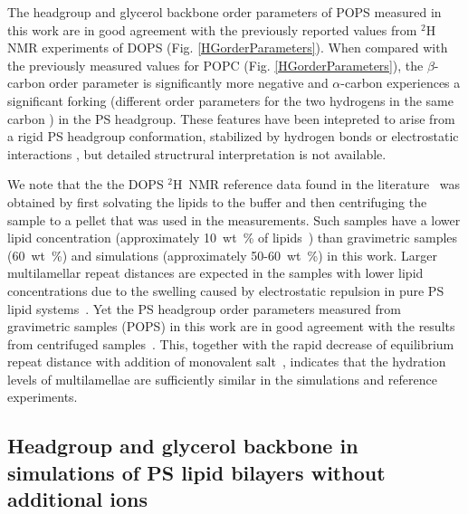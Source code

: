 \documentclass[aps,prl,superscriptaddress,twocolumn]{revtex4}
\begin{document}
 

The headgroup and glycerol backbone order parameters of 
POPS measured in this work are in good agreement with the previously reported
values from $^2$H\,NMR experiments of DOPS \cite{browning80} (Fig. \ref{HGorderParameters}).
When compared with the previously measured values for POPC \cite{ferreira13} (Fig. \ref{HGorderParameters}),
the $\beta$-carbon order parameter is significantly more negative and $\alpha$-carbon
experiences a significant forking (different order parameters for the two hydrogens in the same carbon \cite{ollila16}) in the PS headgroup.
These features have been intepreted to arise from a rigid PS headgroup
conformation, stabilized by hydrogen bonds or electrostatic
interactions \cite{browning80,buldt81}, but detailed structrural interpretation is not
available. 

We note that the the DOPS $^2$H~NMR reference data found in the literature~\cite{browning80,roux90} was obtained by first solvating the lipids to the buffer and then centrifuging the sample to a pellet that was used in the measurements. Such samples have a lower lipid concentration
(approximately 10~wt~\% of lipids~\cite{browning80,roux88,roux90}) than 
gravimetric samples (60~wt~\%) and simulations (approximately 50-60~wt~\%) in this work.
Larger multilamellar repeat distances are expected in the samples with lower lipid
concentrations due to the swelling caused by electrostatic repulsion in pure PS lipid systems~\cite{millman82}.
Yet the PS headgroup order parameters measured from gravimetric samples (POPS) in this work
are in good agreement with the results from centrifuged samples~\cite{browning80}. This, together with the rapid decrease of equilibrium repeat distance with addition of monovalent salt~\cite{millman82,rand89}, indicates that the hydration levels of multilamellae are sufficiently similar in the simulations and reference experiments.


\subsection{Headgroup and glycerol backbone in simulations of PS lipid bilayers without additional ions}
\end{document}
